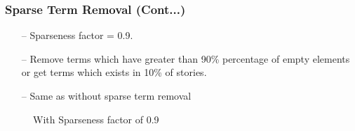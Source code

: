\documentclass{beamer}
\begin{document}
\begin{frame}[noframenumbering]
\frametitle{Sparse Term Removal (Cont...)}
\begin{itemize}
\item[--] Sparseness factor = 0.9. \hyperlink{Story Classification using Keyword based Features}{\beamerreturnbutton{}}
\item[--] Remove terms which have greater than 90\% percentage of empty elements or get terms which exists in 10\% of stories.
\item[--] Same as without sparse term removal
\end{itemize} 
\begin{figure}[h] 
\centering
{}
\centering
\caption{With Sparseness factor of 0.9}
\label{DTM}
\end{figure}

\end{frame}
\end{document}
